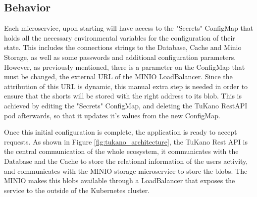 \documentclass[10pt,a4paper,twocolumn]{article}
\begin{document}
\subsection{Behavior}
\label{sec:behaviour}
Each microservice, upon starting will have access to the "Secrets" ConfigMap that holds all the necessary environmental variables for the configuration of their state. This includes the connections strings to the Database, Cache and Minio Storage, as well as some passwords and additional configuration parameters. However, as previously mentioned, there is a parameter on the ConfigMap that must be changed, the external URL of the MINIO LoadBalancer. Since the attribution of this URL is dynamic, this manual extra step is needed in order to ensure that the shorts will be stored with the right address to its blob. This is achieved by editing the "Secrets" ConfigMap, and deleting the TuKano RestAPI pod afterwards, so that it updates it's values from the new ConfigMap.
\par Once this initial configuration is complete, the application is ready to accept requests. As shown in Figure \ref{fig:tukano_architecture}, the TuKano Rest API is the central communication of the whole ecosystem, it communicates with the Database and the Cache to store the relational information of the users activity, and communicates with the MINIO storage microservice to store the blobs. The MINIO makes this blobs available through a LoadBalancer that exposes the service to the outside of the Kubernetes cluster.
\end{document}
